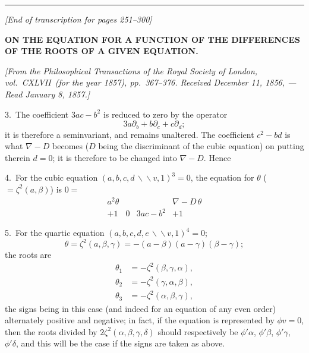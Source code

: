 \documentclass[11pt,a4paper]{book}
\begin{document}
\vspace{12pt}
\noindent\rule{\textwidth}{0.4pt}
\begin{center}
\textit{[End of transcription for pages 251--300]}
\end{center}
\clearpage


\setcounter{page}{301}


\begin{center}
\textbf{ON THE EQUATION FOR A FUNCTION OF THE DIFFERENCES OF THE ROOTS OF A GIVEN EQUATION.}\par
\smallskip
\textit{[From the \textit{Philosophical Transactions} of the Royal Society of London, vol.~CXLVII\ (for the year 1857), pp.~367--376. Received December 11, 1856, --- Read January 8, 1857.]}
\end{center}

\smallskip

3.\ The coefficient $3ac-b^2$ is reduced to zero by the operator
\[
3a\partial_b + b\partial_c + c\partial_d;
\]
it is therefore a seminvariant, and remains unaltered. The coefficient $c^2-bd$ is what $\nabla-D$ becomes ($D$ being the discriminant of the cubic equation) on putting therein $d=0$; it is therefore to be changed into $\nabla-D$. Hence

4.\ For the cubic equation $(a,b,c,d\,\backslash\!\!\backslash v,1)^3=0$, the equation for $\theta$ ($=\zeta^2(a,\beta)$) is $0=$
\[
\begin{array}{cccc}
a^2\theta & & & \nabla-D\,\theta\\
+1 & 0 & 3ac-b^2 & +1
\end{array}
\]

5.\ For the quartic equation $(a,b,c,d,e\,\backslash\!\!\backslash v,1)^4=0$;
\[
\theta = \zeta^2(a,\beta,\gamma) = -(a-\beta)(a-\gamma)(\beta-\gamma);
\]
the roots are
\begin{align*}
\theta_1 &= -\zeta^2(\beta,\gamma,\alpha),\\
\theta_2 &= -\zeta^2(\gamma,\alpha,\beta),\\
\theta_3 &= -\zeta^2(\alpha,\beta,\gamma),
\end{align*}
the signs being in this case (and indeed for an equation of any even order) alternately positive and negative; in fact, if the equation is represented by $\phi v=0$, then the roots divided by $2\zeta^2(\alpha,\beta,\gamma,\delta)$ should respectively be $\phi'\alpha$, $\phi'\beta$, $\phi'\gamma$, $\phi'\delta$, and this will be the case if the signs are taken as above.
\end{document}
